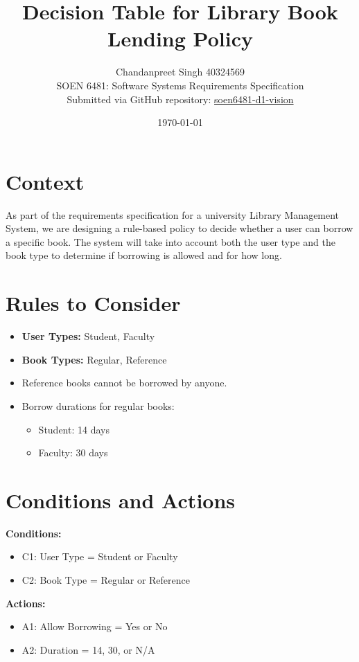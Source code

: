 \documentclass[12pt]{article}
\title{Decision Table for Library Book Lending Policy}
\author{Chandanpreet Singh 40324569\\
SOEN 6481: Software Systems Requirements Specification\\
Submitted via GitHub repository: \href{https://github.com/chandanpreet707/soen6481-d1-vision}{soen6481-d1-vision}
}
\date{\today}
\begin{document}
\maketitle

\section{Context}

As part of the requirements specification for a university Library Management System, we are designing a rule-based policy to decide whether a user can borrow a specific book. The system will take into account both the user type and the book type to determine if borrowing is allowed and for how long.

\section{Rules to Consider}

\begin{itemize}
    \item \textbf{User Types:} Student, Faculty
    \item \textbf{Book Types:} Regular, Reference
    \item Reference books cannot be borrowed by anyone.
    \item Borrow durations for regular books:
    \begin{itemize}
        \item Student: 14 days
        \item Faculty: 30 days
    \end{itemize}
\end{itemize}

\section{Conditions and Actions}

\textbf{Conditions:}
\begin{itemize}
    \item C1: User Type = Student or Faculty
    \item C2: Book Type = Regular or Reference
\end{itemize}

\textbf{Actions:}
\begin{itemize}
    \item A1: Allow Borrowing = Yes or No
    \item A2: Duration = 14, 30, or N/A
\end{itemize}
\end{document}

